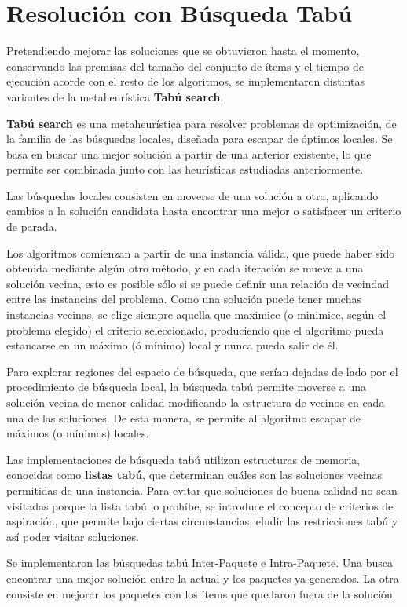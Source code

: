 \section{Resolución con Búsqueda Tabú}
Pretendiendo mejorar las soluciones que se obtuvieron hasta el momento, conservando las premisas del tamaño del conjunto de ítems y el tiempo de ejecución acorde con el resto de los algoritmos, se implementaron distintas variantes de la metaheurística \textbf{Tabú search}. 

\textbf{Tabú search} \cite{TS-1,TS-2} es una metaheurística para resolver problemas de optimización, de la familia de las búsquedas locales, diseñada para escapar de óptimos locales. Se basa en buscar una mejor solución a partir de una anterior existente, lo que permite ser combinada junto con las heurísticas estudiadas anteriormente. 

Las búsquedas locales consisten en moverse de una solución a otra, aplicando cambios a la solución candidata hasta encontrar una mejor o satisfacer un criterio de parada. 

Los algoritmos comienzan a partir de una instancia válida, que puede haber sido obtenida mediante algún otro método, y en cada iteración se mueve a una solución vecina, esto es posible sólo si se puede definir una relación de vecindad entre las instancias del problema. Como una solución puede tener muchas instancias vecinas, se elige siempre aquella que maximice (o minimice, según el problema elegido) el criterio seleccionado, produciendo que el algoritmo pueda estancarse en un máximo (ó mínimo) local y nunca pueda salir de él.

Para explorar regiones del espacio de búsqueda, que serían dejadas de lado por el procedimiento de búsqueda local, la búsqueda tabú permite moverse a una solución vecina de menor calidad modificando la estructura de vecinos en cada una de las soluciones. De esta manera, se permite al algoritmo escapar de máximos (o mínimos) locales.

Las implementaciones de búsqueda tabú utilizan estructuras de memoria, conocidas como \textbf{listas tabú}, que determinan cuáles son las soluciones vecinas permitidas de una instancia. Para evitar que soluciones de buena calidad no sean visitadas porque la lista tabú lo prohíbe, se introduce el concepto de criterios de aspiración, que permite bajo ciertas circunstancias, eludir las restricciones tabú y así poder visitar soluciones.

Se implementaron las búsquedas tabú Inter-Paquete e Intra-Paquete. Una busca encontrar una mejor solución entre la actual y los paquetes ya generados. La otra consiste en mejorar los paquetes con los ítems que quedaron fuera de la solución.

